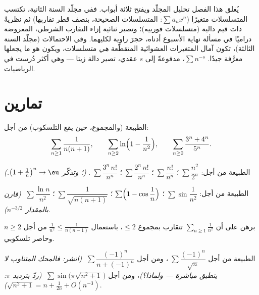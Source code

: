 \begin{remark}
يُغلق هذا الفصل تحليل المجلّد ويفتح ثلاثة
أبواب. ففي مجلّد السنة الثانية، تكتسب المتسلسلات متغيرًا ($\sum
a_n x^n$: المتسلسلات الصحيحة، بنصف قطر تقاربها) ثم
نظريةً ذات قيم دالية (متسلسلات فورييه)؛ وتصير ثنائية
 إزاء التقارب الشرطي، المعروضة دراميًا في
مسألة نهاية الأسبوع أدناه، حجرَ زاوية لكليهما. وفي
الاحتمالات (مجلّد السنة الثالثة)، تكون آمال المتغيرات العشوائية
المتقطّعة \emph{هي} متسلسلات، ويكون  هو ما
يجعلها معرَّفة جيدًا.  $\sum n^{-s}$،
مدفوعةً إلى $s$ عقدي، تصير دالة زيتا --- وهي
أكثر  دُرست في الرياضيات.
\end{remark}

\section{تمارين}

\begin{exercise}[$\star$]\label{exo:b1:series:1}
الطبيعة (والمجموع، حين يقع التلسكوب) من أجل:
\[
\sum_{n\geq1} \frac{1}{n(n+1)},
\qquad
\sum_{n\geq2} \ln\Bigl(1 - \frac{1}{n^2}\Bigr),
\qquad
\sum_{n\geq0} \frac{3^n + 4^n}{5^n} .
\]
\end{exercise}

\begin{exercise}[$\star$]\label{exo:b1:series:2}
الطبيعة من أجل: $\;\sum \dfrac{n^2}{2^n}$؛ $\;\sum \dfrac{n!}{n^n}$؛
$\;\sum \dfrac{2^n\,n!}{n^n}$؛ $\;\sum \dfrac{3^n\,n!}{n^n}$.
\emph{(؛ وتذكّر $\bigl(1 + \frac1n\bigr)^n \to \eu$.)}
\end{exercise}

\begin{exercise}[$\star$]\label{exo:b1:series:3}
الطبيعة من أجل: $\;\sum \sin\dfrac{1}{n^2}$؛ $\;\sum
\Bigl(1 - \cos\dfrac1n\Bigr)$؛ $\;\sum \dfrac{1}{\sqrt{n(n+1)}}$؛
$\;\sum \dfrac{\ln n}{n^2}$ \emph{(قارن بالمقدار $n^{-3/2}$)}.
\end{exercise}

\begin{exercise}[$\star$]\label{exo:b1:series:4}
برهن على أن $\sum_{n\geq1} \frac{1}{n^2}$ تتقارب بمجموع $\leq 2$،
باستعمال $\frac{1}{n^2} \leq \frac{1}{n(n-1)}$ من أجل $n \geq 2$ وحاصر
تلسكوبي.
\end{exercise}

\begin{exercise}[$\star\star$]\label{exo:b1:series:5}
الطبيعة من أجل $\;\sum \dfrac{(-1)^n}{\sqrt n}$، ومن أجل $\;\sum
\dfrac{(-1)^n}{n + (-1)^n}$ \emph{(انشر: فالمحك المتناوب لا
ينطبق مباشرة --- ولماذا؟)}، ومن أجل $\;\sum
\sin\bigl(\pi\sqrt{n^2+1}\,\bigr)$ \emph{(ردّ بترديد $\pi$:
$\sqrt{n^2+1} = n + \frac{1}{2n} + O(n^{-3})$)}.
\end{exercise}

